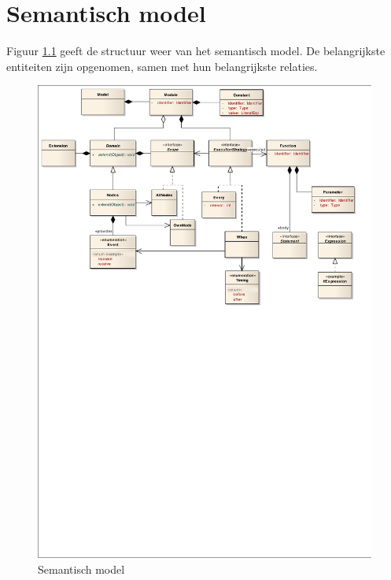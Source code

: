 
\chapter{Semantisch model}
\label{appendix:semantic-model}

Figuur \ref{fig:arch-semantic-model} geeft de structuur weer van het semantisch
model. De belangrijkste entiteiten zijn opgenomen, samen met hun belangrijkste
relaties.

\begin{figure}[ht]
  \centering
  \includegraphics[width=\linewidth]{resources/semantic.pdf}
  \caption{Semantisch model}
  \label{fig:arch-semantic-model}
\end{figure}
